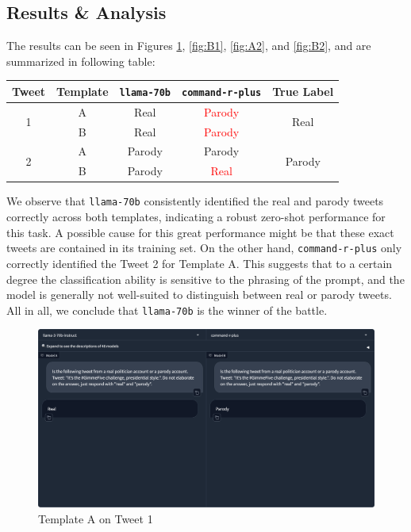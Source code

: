\documentclass[12pt,a4paper]{article}
\begin{document}
\subsection{Results \& Analysis}

The results can be seen in Figures \ref{fig:A1}, \ref{fig:B1}, \ref{fig:A2}, and \ref{fig:B2}, and are summarized in following table:\vspace{-0.3em}

\footnotesize
\begin{center}
\begin{tabular}{c c | c c c}
 \textbf{Tweet} & \textbf{Template} & \texttt{llama-70b} & \texttt{command-r-plus} & \textbf{True Label} \\ \hline
\multirow{2}{*}{1} & A & Real & \textcolor{red}{Parody} & \multirow{2}{*}{Real}  \\
 & B & Real & \textcolor{red}{Parody} \\ \hline
\multirow{2}{*}{2} & A & Parody & Parody & \multirow{2}{*}{Parody} \\
 & B & Parody & \textcolor{red}{Real} & \\
\end{tabular}
\end{center}
\normalsize
\vspace{-0.4em}

\noindent We observe that \texttt{llama-70b} consistently identified the real and parody tweets correctly across both templates, indicating a robust zero-shot performance for this task. A possible cause for this great performance might be that these exact tweets are contained in its training set. On the other hand, \texttt{command-r-plus} only correctly identified the Tweet 2 for Template A. %
This suggests that to a certain degree the classification ability is sensitive to the phrasing of the prompt, and the model is generally not well-suited to distinguish between real or parody tweets. All in all, we conclude that \texttt{llama-70b} is the winner of the battle.

\begin{figure}
    \centering
    \includegraphics[width=\linewidth]{Assignment_3/Report/Figures/template-A-tweet-1.png}
    \caption{Template A on Tweet 1}
    \label{fig:A1}
\end{figure}
\end{document}
